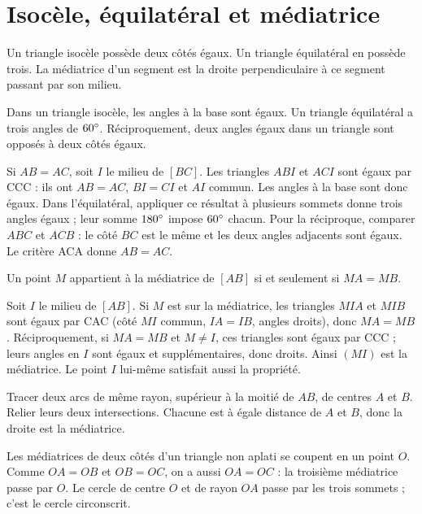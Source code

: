 \documentclass[../cours_3e.tex]{subfiles}
\begin{document}
\section{Isocèle, équilatéral et médiatrice}
\begin{definition}
Un triangle isocèle possède deux côtés égaux. Un triangle équilatéral en possède trois. La médiatrice d'un segment est la droite perpendiculaire à ce segment passant par son milieu.
\end{definition}
\begin{propriete}
Dans un triangle isocèle, les angles à la base sont égaux. Un triangle équilatéral a trois angles de $60^{\circ}$. Réciproquement, deux angles égaux dans un triangle sont opposés à deux côtés égaux.
\end{propriete}
\begin{demonstration}
Si $AB=AC$, soit $I$ le milieu de $[BC]$. Les triangles $ABI$ et $ACI$ sont égaux par CCC : ils ont $AB=AC$, $BI=CI$ et $AI$ commun. Les angles à la base sont donc égaux. Dans l'équilatéral, appliquer ce résultat à plusieurs sommets donne trois angles égaux ; leur somme $180^{\circ}$ impose $60^{\circ}$ chacun.
Pour la réciproque, comparer $ABC$ et $ACB$ : le côté $BC$ est le même et les deux angles adjacents sont égaux. Le critère ACA donne $AB=AC$.
\end{demonstration}
\begin{theoreme}
Un point $M$ appartient à la médiatrice de $[AB]$ si et seulement si $MA=MB$.
\end{theoreme}
\begin{demonstration}
Soit $I$ le milieu de $[AB]$. Si $M$ est sur la médiatrice, les triangles $MIA$ et $MIB$ sont égaux par CAC (côté $MI$ commun, $IA=IB$, angles droits), donc $MA=MB$. Réciproquement, si $MA=MB$ et $M\ne I$, ces triangles sont égaux par CCC ; leurs angles en $I$ sont égaux et supplémentaires, donc droits. Ainsi $(MI)$ est la médiatrice. Le point $I$ lui-même satisfait aussi la propriété.
\end{demonstration}
\begin{methode}
Tracer deux arcs de même rayon, supérieur à la moitié de $AB$, de centres $A$ et $B$. Relier leurs deux intersections. Chacune est à égale distance de $A$ et $B$, donc la droite est la médiatrice.
\end{methode}
Les médiatrices de deux côtés d'un triangle non aplati se coupent en un point $O$. Comme $OA=OB$ et $OB=OC$, on a aussi $OA=OC$ : la troisième médiatrice passe par $O$. Le cercle de centre $O$ et de rayon $OA$ passe par les trois sommets ; c'est le cercle circonscrit.
\end{document}
